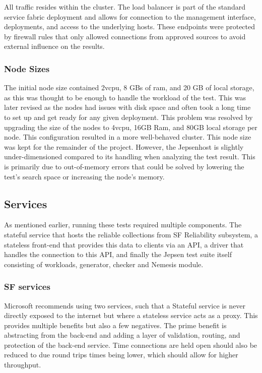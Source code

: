 \documentclass[a4paper,10pt,titlepage]{report}
\begin{document}
    All traffic resides within the cluster. The load balancer is part of the standard service fabric deployment and allows for connection to the management interface, deployments, and access to the underlying hosts. These endpoints were protected by firewall rules that only allowed connections from approved sources to avoid external influence on the results.

    \subsubsection*{Node Sizes}

    The initial node size contained 2vcpu, 8 GBs of ram, and 20 GB of local storage, as this was thought to be enough to handle the workload of the test. This was later revised as the nodes had issues with disk space and often took a long time to set up and get ready for any given deployment. This problem was resolved by upgrading the size of the nodes to 4vcpu, 16GB Ram, and 80GB local storage per node. This configuration resulted in a more well-behaved cluster. This node size was kept for the remainder of the project. However, the Jepsenhost is slightly under-dimensioned compared to its handling when analyzing the test result. This is primarily due to out-of-memory errors that could be solved by lowering the test's search space or increasing the node's memory.


    \subsection{Services}
    As mentioned earlier, running these tests required multiple components. The stateful service that hosts the reliable collections from SF Reliability subsystem, a stateless front-end that provides this data to clients via an API, a driver that handles the connection to this API, and finally the Jepsen test suite itself consisting of workloads, generator, checker and Nemesis module.

    \subsubsection{SF services}
    Microsoft recommends using two services, such that a Stateful service is never directly exposed to the internet but where a stateless service acts as a proxy. This provides multiple benefits but also a few negatives. The prime benefit is abstracting from the back-end and adding a layer of validation, routing, and protection of the back-end service. Time connections are held open should also be reduced to due round trips times being lower, which should allow for higher throughput.
\end{document}
